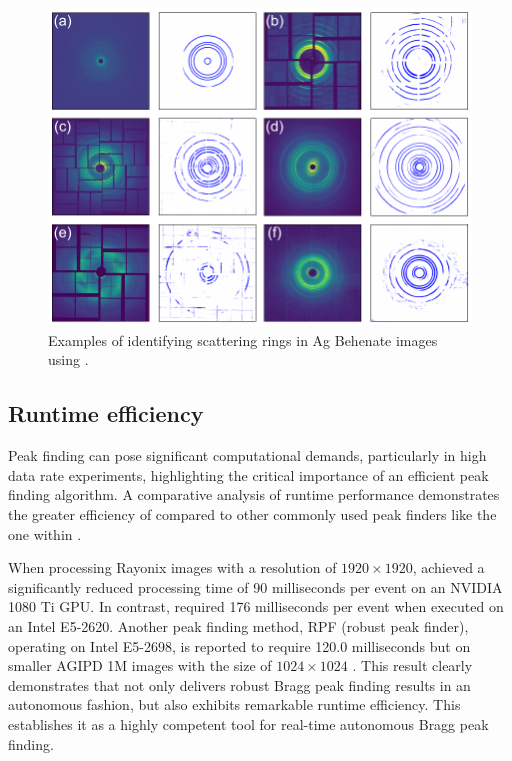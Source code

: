 \documentclass[a4paper]{article}
\begin{document}
\begin{figure}[!ht]
\centering
\includegraphics[width=\textwidth,keepaspectratio]
{./figures/automask.agbehnate.pdf}
\caption{Examples of identifying scattering rings in Ag Behenate images using
\peaknet{}.}
\label{fig : automask 2}
\end{figure}


\subsection{Runtime efficiency}

Peak finding can pose significant computational demands, particularly in high data rate experiments, highlighting the critical importance of an efficient peak finding algorithm.  A comparative analysis of runtime performance demonstrates the greater efficiency of \peaknet{} compared to other commonly used peak finders like the one within \psocake{}.

When processing Rayonix images with a resolution of $1920 \times 1920$, \peaknet{} achieved a significantly reduced processing time of 90 milliseconds per event on an NVIDIA 1080 Ti GPU.  In contrast, \psocake{} required 176 milliseconds per event when executed on an Intel E5-2620.  Another peak finding method, RPF (robust peak finder), operating on Intel E5-2698, is reported to require 120.0 milliseconds but on smaller AGIPD 1M images with the size of $1024 \times 1024$ \citep{hadian-jaziDataReductionSerial2021}.  This result clearly demonstrates that \peaknet{} not only delivers robust Bragg peak finding results in an autonomous fashion, but also exhibits remarkable runtime efficiency.  This establishes it as a highly competent tool for real-time autonomous Bragg peak finding.
\end{document}
